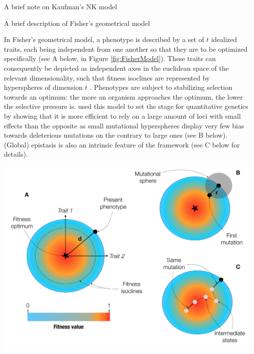 \begin{mybox}{\begin{Note-box}
\label{Box-NKModel}A brief note on Kaufman's NK model\end{Note-box}}
\begin{center}
    \label{fig:NKModel}
    \end{center}
\end{mybox}

\begin{mybox}{\begin{Note-box}
\label{Box-FisherModel}A brief description of Fisher's geometrical model\end{Note-box}}
\onehalfspacing
In Fisher's geometrical model, a phenotype is described by a set of $t$ idealized traits, each being independent from one another so that they are to be optimized specifically \citep{Fisher30} (see A below, in Figure \ref{fig:FisherModel}). These traits can consequently be depicted as independent axes in the euclidean space of the relevant dimensionality, such that fitness isoclines are represented by hyperspheres of dimension $t$ \citep{Tenaillon14}. Phenotypes are subject to stabilizing selection towards an optimum: the more an organism approaches the optimum, the lower the selective pressure is. %
\citet{Fisher30} used this model to set the stage for quantitative genetics by showing that it is more efficient to rely on a large amount of loci with small effects than the opposite as small mutational hyperspheres display very few bias towards deleterious mutations on the contrary to large ones (see B below). (Global) epistasis is also an intrinsic feature of the framework (see C below for details).
\begin{center}
    \includegraphics[scale=0.385,trim=0cm 0cm 0cm 0cm,clip]{pics/Epistasis/Fisher-Model.pdf}

\end{center}
\end{mybox}

